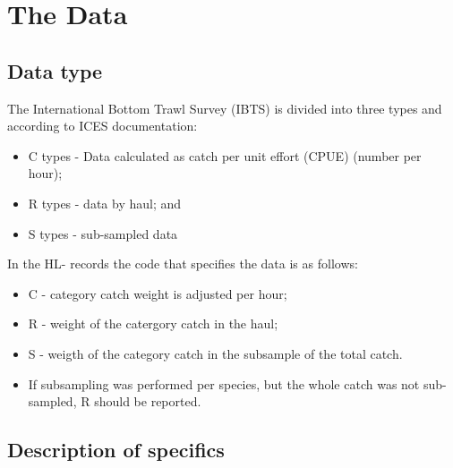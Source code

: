 \documentclass[useAMS,referee]{biom}
\numberwithin{equation}{section}
\begin{document}
\section{The Data}


\subsection{Data type}
The International Bottom Trawl Survey (IBTS) is divided into three types and according to ICES documentation: 

\begin{itemize}
\item C types - Data calculated as catch per unit effort (CPUE) (number per hour);  
\item R types -  data by haul; and 
\item S types - sub-sampled data\\
\end{itemize}


In the HL- records the code that specifies the data is as follows:

\begin{itemize}
\item C - category catch weight is adjusted per hour;  
\item R  -  weight of the catergory catch in the haul; 
\item S  - weigth of the category catch in the subsample of the total catch.
\item If subsampling was performed per species, but the whole 
 catch was not sub-sampled, R should be reported.
\end{itemize}


\subsection{Description of specifics }
\end{document}
